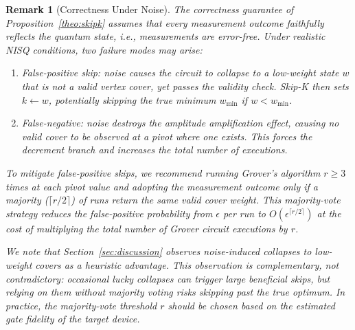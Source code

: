 \documentclass{ieeeaccess}
\newtheorem{rem}{Remark}
\begin{document}
\begin{rem}[Correctness Under Noise]
\label{rem:skipk-noise}
The correctness guarantee of
Proposition~\ref{theo:skipk} assumes that every measurement
outcome faithfully reflects the quantum state, i.e.,
measurements are error-free. Under realistic NISQ conditions,
two failure modes may arise:

\begin{enumerate}
    \item \textit{False-positive skip}: noise causes the
    circuit to collapse to a low-weight state $w$ that is
    \emph{not} a valid vertex cover, yet passes the validity
    check. Skip-K then sets $k \leftarrow w$, potentially
    skipping the true minimum $w_{\min}$ if
    $w < w_{\min}$.

    \item \textit{False-negative}: noise destroys the
    amplitude amplification effect, causing no valid cover
    to be observed at a pivot where one exists. This forces
    the decrement branch and increases the total number of
    executions.
\end{enumerate}

To mitigate false-positive skips, we recommend running
Grover's algorithm $r \geq 3$ times at each pivot value and
adopting the measurement outcome only if a majority
($\lceil r/2 \rceil$) of runs return the same valid cover
weight. This majority-vote strategy reduces the
false-positive probability from $\epsilon$ per run to
$O(\epsilon^{\lceil r/2 \rceil})$ at the cost of
multiplying the total number of Grover circuit executions
by $r$.

We note that Section~\ref{sec:discussion} observes
noise-induced collapses to low-weight covers as a
\emph{heuristic} advantage. This observation is
complementary, not contradictory: occasional lucky collapses
can trigger large beneficial skips, but relying on them
without majority voting risks skipping past the true
optimum. In practice, the majority-vote threshold $r$
should be chosen based on the estimated gate fidelity of
the target device.
\end{rem}
\end{document}
